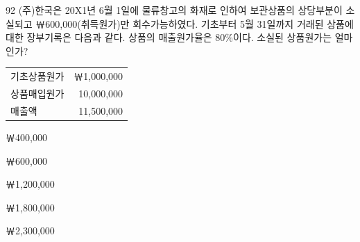 \begin{question}{92}
(주)한국은 20X1년 6월 1일에 물류창고의 화재로 인하여 보관상품의 상당부분이 소실되고 ￦600,000(취득원가)만 회수가능하였다. 기초부터 5월 31일까지 거래된 상품에 대한 장부기록은 다음과 같다. 상품의 매출원가율은 80\%이다. 소실된 상품원가는 얼마인가?

{\small\centering
\begin{tabular}{lr}
\hline
기초상품원가 & ￦1,000,000 \\
상품매입원가 & 10,000,000 \\
매출액 & 11,500,000 \\
\hline
\end{tabular}
\par}

\begin{choices}
  \item ￦400,000
  \item ￦600,000
  \item ￦1,200,000
  \item ￦1,800,000
  \item ￦2,300,000
\end{choices}
\end{question}
